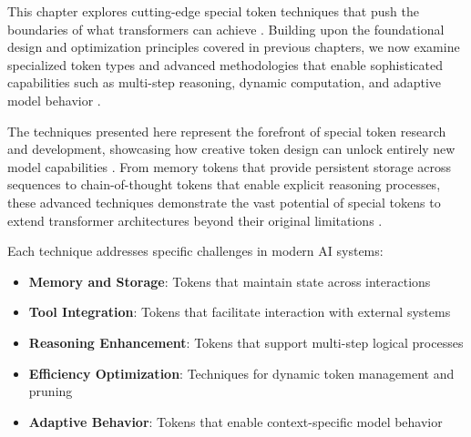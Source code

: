 
This chapter explores cutting-edge special token techniques that push the boundaries of what transformers can achieve \citep{wei2022chain, schick2023toolformer}. Building upon the foundational design and optimization principles covered in previous chapters, we now examine specialized token types and advanced methodologies that enable sophisticated capabilities such as multi-step reasoning, dynamic computation, and adaptive model behavior \citep{kojima2022large, yao2024tree}.

The techniques presented here represent the forefront of special token research and development, showcasing how creative token design can unlock entirely new model capabilities \citep{zhou2022least}. From memory tokens that provide persistent storage across sequences to chain-of-thought tokens that enable explicit reasoning processes, these advanced techniques demonstrate the vast potential of special tokens to extend transformer architectures beyond their original limitations \citep{qin2023tool, patil2023gorilla}.

\begin{comment}
Feedback: This is a strong opening. To make it more engaging, you could frame it as the "nurturing" phase. For example: "If designing a special token is like creating a new tool, training is the process of teaching the model how to use it. A powerful tool is useless in untrained hands. This chapter explores the specialized training techniques required to cultivate the full potential of special tokens, transforming them from simple placeholders into powerful functional components of the model's reasoning process."

STATUS: updated - completely rewritten for advanced techniques focus instead of training
\end{comment}

Each technique addresses specific challenges in modern AI systems:
\begin{itemize}
\item \textbf{Memory and Storage}: Tokens that maintain state across interactions
\item \textbf{Tool Integration}: Tokens that facilitate interaction with external systems
\item \textbf{Reasoning Enhancement}: Tokens that support multi-step logical processes
\item \textbf{Efficiency Optimization}: Techniques for dynamic token management and pruning
\item \textbf{Adaptive Behavior}: Tokens that enable context-specific model behavior
\end{itemize}

